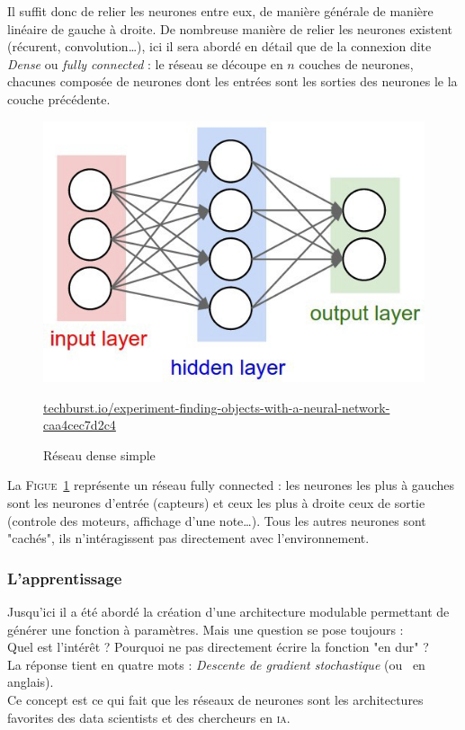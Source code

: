 Il suffit donc de relier les neurones entre eux, de manière générale de manière linéaire de gauche à droite.
De nombreuse manière de relier les neurones existent (récurent, convolution\ldots),
ici il sera abordé en détail que de la connexion dite \emph{Dense} ou \emph{fully connected} :
le réseau se découpe en $n$ couches de neurones,
chacunes composée de neurones dont les entrées sont les sorties des neurones le la couche précédente.
\begin{figure}[H]
    \center
    \includegraphics[height=\moyen]{pict/net1.jpeg}
	\caption{Réseau dense simple}
    {\footnotesize \url{techburst.io/experiment-finding-objects-with-a-neural-network-caa4cec7d2c4}}
	\label{fig:simple-dense}
\end{figure}
La \textsc{Figue}\ \ref{fig:simple-dense} représente un réseau fully connected :
les neurones les plus à gauches sont les neurones d'entrée (capteurs)
et ceux les plus à droite ceux de sortie (controle des moteurs, affichage d'une note\ldots).
Tous les autres neurones sont "cachés", ils n'intéragissent pas directement avec l'environnement.


\subsubsection{L'apprentissage}
Jusqu'ici il a été abordé la création d'une architecture modulable permettant de générer une fonction à paramètres.
Mais une question se pose toujours :\\
Quel est l'intérêt ?
Pourquoi ne pas directement écrire la fonction "en dur" ?\\
La réponse tient en quatre mots : \textit{Descente de gradient stochastique} (ou  \sgd\ en anglais). \\
Ce concept est ce qui fait que les réseaux de neurones sont les architectures favorites
des data scientists et des chercheurs en \textsc{ia}.\\


